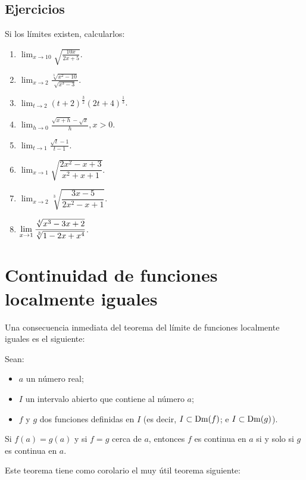 \subsection{Ejercicios}
\begingroup
\small
Si los límites existen, calcularlos:
\begin{multicols}{2}
\begin{enumerate}[leftmargin=*]
\item $\displaystyle \lim_{x\to 10}\sqrt{\frac{10x}{2x+5}}$.
%
\item $\displaystyle \lim_{x\to 2}\frac{\sqrt[3]{x^2-10}}{\sqrt{x^3-3}}$.
%
\item $\displaystyle \lim_{t\to 2}(t+2)^\frac{3}{2}(2t+4)^\frac{1}{3}$.
%
\item $\displaystyle \lim_{h\to 0}\frac{\sqrt{x+h}-\sqrt{x}}{h}, x>0$.
%
\item $\displaystyle \lim_{t\to 1}\frac{\sqrt{t}-1}{t-1}$.
%
\item $\displaystyle
	\lim_{x\to 1}\sqrt{\dfrac{2x^2-x+3}{x^2+x+1}}.
$
%
\item $\displaystyle
	\lim_{x\to 2}\sqrt[3]{\dfrac{3x-5}{2x^2-x+1}}.
$
%
\item $\displaystyle \limjc{\frac{\sqrt[4]{x^3 - 3x + 2}}{\sqrt[3]{1 - 2x + x^4}}}{x}{1}$.
\end{enumerate}
\end{multicols}
\endgroup

\section{Continuidad de funciones localmente iguales}

Una consecuencia inmediata del teorema del límite de funciones localmente iguales es el siguiente:

\begin{teocal}
Sean:
\begin{itemize}
\item[] $a$ un número real;
\item[] $I$ un intervalo abierto que contiene al número $a$;
\item[] $f$ y $g$ dos funciones definidas en $I$ (es decir, $I\subset \Dm(f)$; e $I\subset \Dm(g)$).
\end{itemize}
Si $f(a)=g(a)$ y si $f=g$ cerca de $a$, entonces $f$ es continua en $a$ si y solo si $g$ es continua en $a$.
\end{teocal}%

Este teorema tiene como corolario el muy útil teorema siguiente:

